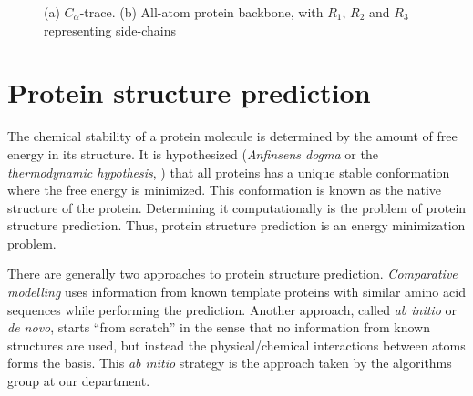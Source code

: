 

\begin{figure}
  \centering
  \caption{(a) $C_{\alpha}$-trace. (b) All-atom protein backbone, with $R_1$, $R_2$ and $R_3$ representing side-chains}
\end{figure}

\section{Protein structure prediction}
The chemical stability of a protein molecule is determined by the
amount of free energy in its structure. It is hypothesized
(\textit{Anfinsens dogma} or the \textit{thermodynamic hypothesis},
\cite{anfinsen73, soundararajan2010}) that all proteins has a unique
stable conformation where the free energy is minimized. This
conformation is known as the native structure of the
protein. Determining it computationally is the problem of protein
structure prediction. Thus, protein structure prediction is an energy
minimization problem.


There are generally two approaches to protein structure prediction.
\textit{Comparative modelling} uses information from known template
proteins with similar amino acid sequences while performing the
prediction. Another approach, called \textit{ab initio} or
\textit{de novo}, starts ``from scratch'' in the sense that no
information from known structures are used, but instead the
physical/chemical interactions between atoms forms the basis. This
\textit{ab initio} strategy is the approach taken by the algorithms
group at our department.

